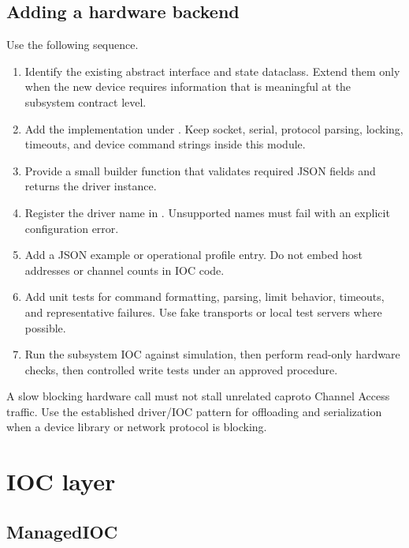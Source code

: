 \subsection{Adding a hardware backend}

Use the following sequence.

\begin{enumerate}
  \item Identify the existing abstract interface and state dataclass. Extend them only when the new device requires information that is meaningful at the subsystem contract level.
  \item Add the implementation under . Keep socket, serial, protocol parsing, locking, timeouts, and device command strings inside this module.
  \item Provide a small builder function that validates required JSON fields and returns the driver instance.
  \item Register the driver name in . Unsupported names must fail with an explicit configuration error.
  \item Add a JSON example or operational profile entry. Do not embed host addresses or channel counts in IOC code.
  \item Add unit tests for command formatting, parsing, limit behavior, timeouts, and representative failures. Use fake transports or local test servers where possible.
  \item Run the subsystem IOC against simulation, then perform read-only hardware checks, then controlled write tests under an approved procedure.
\end{enumerate}

\begin{importantbox}
A slow blocking hardware call must not stall unrelated caproto Channel Access traffic. Use the established driver/IOC pattern for offloading and serialization when a device library or network protocol is blocking.
\end{importantbox}

\section{IOC layer}

\subsection{ManagedIOC}

